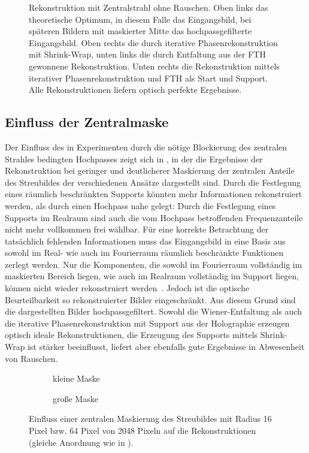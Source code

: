 \begin{figure}
	\caption[2D Rekonstruktion: Ideal]{Rekonstruktion mit Zentralstrahl ohne Rauschen. Oben links das theoretische Optimum, in diesem Falle das Eingangsbild, bei späteren Bildern mit maskierter Mitte das hochpassgefilterte Eingangsbild. Oben rechts die durch iterative Phasenrekonstruktion mit Shrink-Wrap, unten links die durch Entfaltung  aus der FTH gewonnene Rekonstruktion. Unten rechts die Rekonstruktion mittels iterativer Phasenrekonstruktion und FTH als Start und Support. Alle Rekonstruktionen liefern optisch perfekte Ergebnisse.}
	\label{fig:recon2d-perfect}
\end{figure}

\subsection{Einfluss der Zentralmaske}
Der Einfluss des in Experimenten durch die nötige Blockierung des zentralen Strahles bedingten Hochpasses zeigt sich in , in der die Ergebnisse der Rekonstruktion bei geringer und deutlicherer Maskierung der zentralen Anteile des Streubildes der verschiedenen Ansätze dargestellt sind. Durch die Festlegung eines räumlich beschränkten Supports könnten mehr Informationen rekonstruiert werden, als durch einen Hochpass nahe gelegt: Durch die Festlegung eines Supports im Realraum sind auch die vom Hochpass betroffenden Frequenzanteile nicht mehr vollkommen frei wählbar. Für eine korrekte Betrachtung der tatsächlich fehlenden Informationen muss das Eingangsbild in eine Basis aus sowohl im Real- wie auch im Fourierraum räumlich beschränkte Funktionen zerlegt werden. Nur die Komponenten, die sowohl im Fourierraum vollständig im maskierten Bereich liegen, wie auch im Realraum vollständig im Support liegen, können nicht wieder rekonstruiert werden~\cite{thibault2006}. Jedoch ist die optische Beurteilbarkeit so rekonstruierter Bilder eingeschränkt. Aus diesem Grund sind die dargestellten Bilder hochpassgefiltert.
Sowohl die Wiener-Entfaltung als auch die iterative Phasenrekonstruktion mit Support aus der Holographie erzeugen optisch ideale Rekonstruktionen, die Erzeugung des Supports mittels Shrink-Wrap ist stärker beeinflusst, liefert aber ebenfalls gute Ergebnisse in Abwesenheit von Rauschen.
\begin{figure}
	\begin{subfigure}[b]{0.48\textwidth}
		\caption{kleine Maske}
	\end{subfigure}
	\hspace*{\fill}
	\begin{subfigure}[b]{0.48\textwidth}
		\caption{große Maske}	
	\end{subfigure}
	\caption[2D Rekonstruktion: Beamstop]{Einfluss einer zentralen Maskierung des Streubildes mit Radius 16 Pixel bzw. 64 Pixel von 2048 Pixeln auf die Rekonstruktionen (gleiche Anordnung wie in ).}
	\label{fig:recon2d-mask}
\end{figure}

